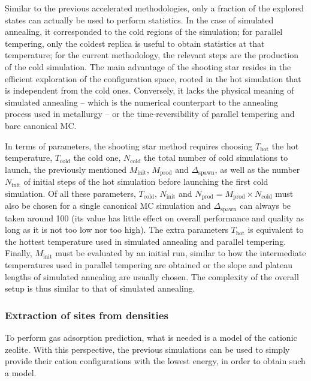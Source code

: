 \documentclass[main.tex]{subfiles}
\begin{document}
Similar to the previous accelerated methodologies, only a fraction of the explored states can actually be used to perform statistics. In the case of simulated annealing, it corresponded to the cold regions of the simulation; for parallel tempering, only the coldest replica is useful to obtain statistics at that temperature; for the current methodology, the relevant steps are the production of the cold simulation. The main advantage of the shooting star resides in the efficient exploration of the configuration space, rooted in the hot simulation that is independent from the cold ones. Conversely, it lacks the physical meaning of simulated annealing -- which is the numerical counterpart to the annealing process used in metallurgy -- or the time-reversibility of parallel tempering and bare canonical MC.

In terms of parameters, the shooting star method requires choosing $T_\text{hot}$ the hot temperature, $T_\text{cold}$ the cold one, $N_\text{cold}$ the total number of cold simulations to launch, the previously mentioned $M_\text{init}$, $M_\text{prod}$ and $\Delta_\text{spawn}$, as well as the number $N_\text{init}$ of initial steps of the hot simulation before launching the first cold simulation. Of all these parameters, $T_\text{cold}$, $N_\text{init}$ and $N_\text{prod} = M_\text{prod}\times N_\text{cold}$ must also be chosen for a single canonical MC simulation and $\Delta_\text{spawn}$ can always be taken around 100 (its value has little effect on overall performance and quality as long as it is not too low nor too high). The extra parameters $T_\text{hot}$ is equivalent to the hottest temperature used in simulated annealing and parallel tempering. Finally, $M_\text{init}$ must be evaluated by an initial run, similar to how the intermediate temperatures used in parallel tempering are obtained or the slope and plateau lengths of simulated annealing are usually chosen. The complexity of the overall setup is thus similar to that of simulated annealing.


\subsubsection{Extraction of sites from densities}

To perform gas adsorption prediction, what is needed is a model of the cationic zeolite. With this perspective, the previous simulations can be used to simply provide their cation configurations with the lowest energy, in order to obtain such a model.
\end{document}
